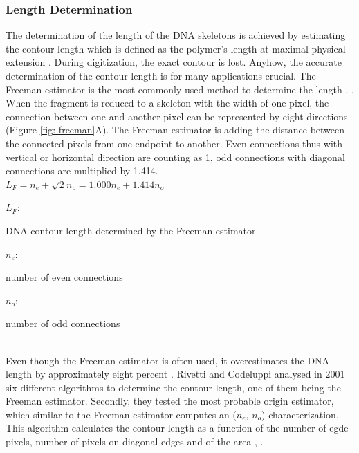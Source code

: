 \documentclass{article}
\begin{document}
\subsubsection{Length Determination}

The determination of the length of the DNA skeletons is achieved by estimating the contour length which is defined as the polymer’s length at maximal physical extension  \cite{rivetti2001accurate}.  During digitization, the exact contour is lost. Anyhow, the accurate determination of the contour length is for many applications crucial. The Freeman estimator is the most commonly used method to determine the length  \cite{spisz1998automated},  \cite{marturelliautomated}. When the fragment is reduced to a skeleton with the width of one pixel, the connection between one and another pixel can be represented by eight directions (Figure \ref{fig: freeman}A). The Freeman estimator is adding the distance between the connected pixels from one endpoint to another. Even connections thus with vertical or horizontal direction are counting as 1, odd connections with diagonal connections are multiplied by 1.414. \\

$ L_{F} = n_{e} + \sqrt{2} n_{o}= 1.000n_{e} + 1.414n_{o}  $ 

\hspace{0,2cm}
 
$ L_{F}$: \begin{footnotesize} 
DNA contour length determined by the Freeman estimator
\end{footnotesize}  

$ n_{e}$: \begin{footnotesize} 
 number of even connections
\end{footnotesize} 
 
$ n_{o}$: \begin{footnotesize} 
 number of odd connections
\end{footnotesize}  \\

Even though the Freeman estimator is often used, it overestimates the DNA length by approximately eight percent  \cite{sanchez2002accuracy}. Rivetti and Codeluppi \cite{rivetti2001accurate} analysed in 2001 six different algorithms to determine the contour length, one of them being the Freeman estimator. 
Secondly, they tested the most probable origin estimator, which similar to the Freeman estimator computes an ($n_{e}$, $n_{o}$) characterization. This algorithm calculates the contour length as a function of the number of egde pixels, number of pixels on diagonal edges and of the area \cite{pan1991root}, \cite{dorst1987length}. \\
\end{document}
